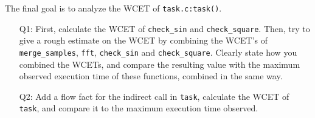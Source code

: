 \label{problem:5}
The final goal is to analyze the WCET of \texttt{task.c:task()}.

\begin{itemize}

\item[Q1:]
  First, calculate the WCET of \texttt{check\_sin} and \texttt{check\_square}.
  Then, try to give a rough estimate on the WCET by combining the WCET's of
  \texttt{merge\_samples}, \texttt{fft}, \texttt{check\_sin} and
  \texttt{check\_square}. Clearly state how you combined the WCETs, and compare
  the resulting value with the maximum observed execution time of these
  functions, combined in the same way.

\item[Q2:]
  Add a flow fact for the indirect call in \texttt{task}, calculate the WCET of
  \texttt{task}, and compare it to the maximum execution time observed.

\end{itemize}

